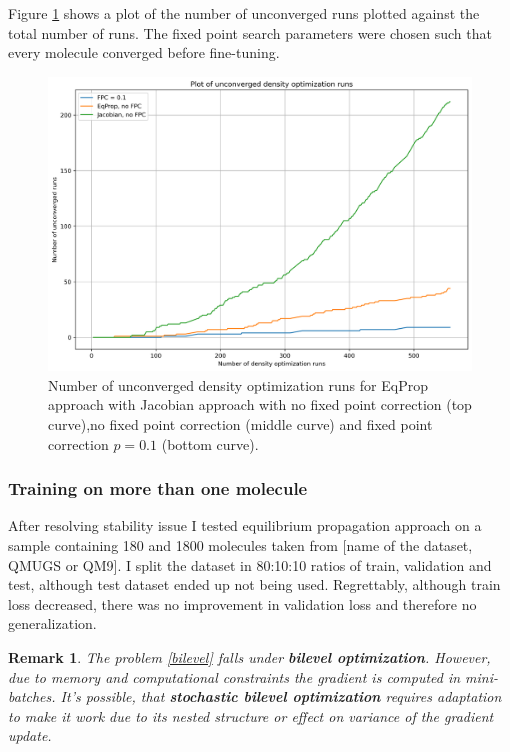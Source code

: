 \documentclass[a4paper,10pt]{report}
\newtheorem{remark}{Remark}
\begin{document}
Figure \ref{fig:stability} shows a plot of the number of unconverged runs plotted against the total number of runs. The fixed point search parameters were chosen such that every molecule converged before fine-tuning.
\begin{figure}[H]
 \centering
 \includegraphics[scale=0.5]{images/stability_plot.png}
 \caption{Number of unconverged density optimization runs for EqProp approach with Jacobian approach with no fixed point correction (top curve),no fixed point correction (middle curve) and  fixed point correction $p=0.1$ (bottom curve).}
 \label{fig:stability}
\end{figure}



\subsubsection{Training on more than one molecule}
After resolving stability issue I tested equilibrium propagation approach on a sample containing 180 and 1800 molecules taken from [name of the dataset, QMUGS or QM9]. I split the dataset in 80:10:10 ratios of train, validation and test, although test dataset ended up not being used. Regrettably, although train loss decreased, there was no improvement in validation loss and therefore no generalization.

\begin{remark}
 The problem \ref{bilevel} falls under \textbf{bilevel optimization}. However, due to memory and computational constraints the gradient is computed in mini-batches. It's possible, that \textbf{stochastic bilevel optimization} requires adaptation to make it work due to its nested structure or effect on variance of the gradient update.
\end{remark}
\end{document}
